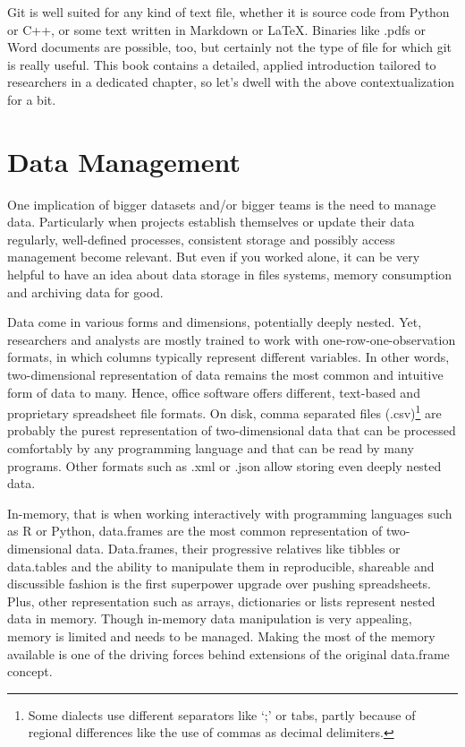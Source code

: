 \documentclass[
  12pt,
  letterpaper,
]{krantz}
\begin{document}
Git is well suited for any kind of text file, whether it is source code
from Python or C++, or some text written in Markdown or LaTeX. Binaries
like .pdfs or Word documents are possible, too, but certainly not the
type of file for which git is really useful. This book contains a
detailed, applied introduction tailored to researchers in a dedicated
 chapter, so let's dwell with the above
contextualization for a bit.

\hypertarget{data-management}{%
\section{Data Management}\label{data-management}}

One implication of bigger datasets and/or bigger teams is the need to
manage data. Particularly when projects establish themselves or update
their data regularly, well-defined processes, consistent storage and
possibly access management become relevant. But even if you worked
alone, it can be very helpful to have an idea about data storage in
files systems, memory consumption and archiving data for good.

Data come in various forms and dimensions, potentially deeply nested.
Yet, researchers and analysts are mostly trained to work with
one-row-one-observation formats, in which columns typically represent
different variables. In other words, two-dimensional representation of
data remains the most common and intuitive form of data to many. Hence,
office software offers different, text-based and proprietary spreadsheet
file formats. On disk, comma separated files (.csv)\footnote{Some
  dialects use different separators like `;' or tabs, partly because of
  regional differences like the use of commas as decimal delimiters.}
are probably the purest representation of two-dimensional data that can
be processed comfortably by any programming language and that can be
read by many programs. Other formats such as .xml or .json allow storing
even deeply nested data.

In-memory, that is when working interactively with programming languages
such as R or Python, data.frames are the most common representation of
two-dimensional data. Data.frames, their progressive relatives like
tibbles or data.tables and the ability to manipulate them in
reproducible, shareable and discussible fashion is the first superpower
upgrade over pushing spreadsheets. Plus, other representation such as
arrays, dictionaries or lists represent nested data in memory. Though
in-memory data manipulation is very appealing, memory is limited and
needs to be managed. Making the most of the memory available is one of
the driving forces behind extensions of the original data.frame concept.
\end{document}
